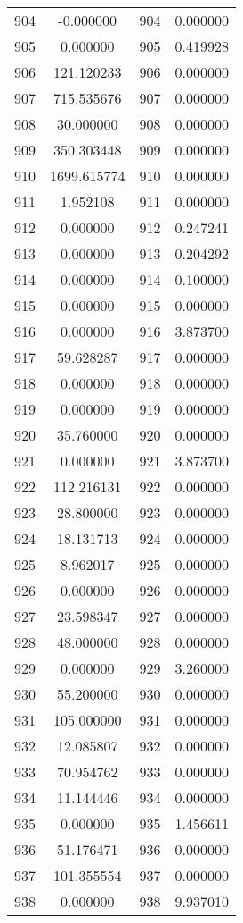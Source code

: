 \documentclass[12pt]{article}
\begin{document}
\begin{longtable}{@{}cccc@{}}
904 & -0.000000 & 904 & 0.000000 \\
905 & 0.000000 & 905 & 0.419928 \\
906 & 121.120233 & 906 & 0.000000 \\
907 & 715.535676 & 907 & 0.000000 \\
908 & 30.000000 & 908 & 0.000000 \\
909 & 350.303448 & 909 & 0.000000 \\
910 & 1699.615774 & 910 & 0.000000 \\
911 & 1.952108 & 911 & 0.000000 \\
912 & 0.000000 & 912 & 0.247241 \\
913 & 0.000000 & 913 & 0.204292 \\
914 & 0.000000 & 914 & 0.100000 \\
915 & 0.000000 & 915 & 0.000000 \\
916 & 0.000000 & 916 & 3.873700 \\
917 & 59.628287 & 917 & 0.000000 \\
918 & 0.000000 & 918 & 0.000000 \\
919 & 0.000000 & 919 & 0.000000 \\
920 & 35.760000 & 920 & 0.000000 \\
921 & 0.000000 & 921 & 3.873700 \\
922 & 112.216131 & 922 & 0.000000 \\
923 & 28.800000 & 923 & 0.000000 \\
924 & 18.131713 & 924 & 0.000000 \\
925 & 8.962017 & 925 & 0.000000 \\
926 & 0.000000 & 926 & 0.000000 \\
927 & 23.598347 & 927 & 0.000000 \\
928 & 48.000000 & 928 & 0.000000 \\
929 & 0.000000 & 929 & 3.260000 \\
930 & 55.200000 & 930 & 0.000000 \\
931 & 105.000000 & 931 & 0.000000 \\
932 & 12.085807 & 932 & 0.000000 \\
933 & 70.954762 & 933 & 0.000000 \\
934 & 11.144446 & 934 & 0.000000 \\
935 & 0.000000 & 935 & 1.456611 \\
936 & 51.176471 & 936 & 0.000000 \\
937 & 101.355554 & 937 & 0.000000 \\
938 & 0.000000 & 938 & 9.937010 \\

\end{longtable}
\end{document}
